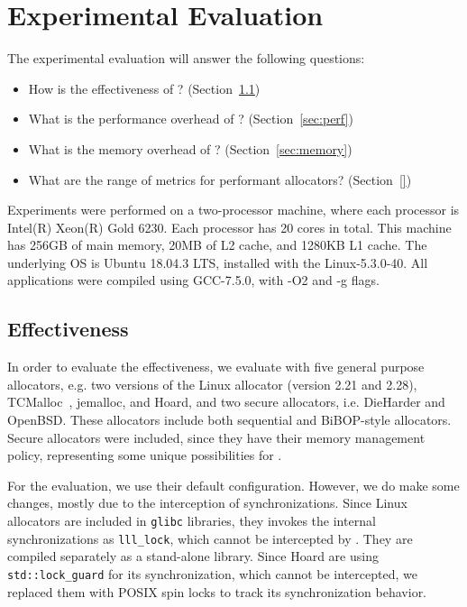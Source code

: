 \section{Experimental Evaluation}
\label{sec:evaluation}

The experimental evaluation will answer the following questions:
\begin{itemize}
\item How is the effectiveness of \MP{}? (Section~\ref{sec:effectiveness}) 	
\item What is the performance overhead of \MP{}? (Section~\ref{sec:perf})
\item What is the memory overhead of \MP{}? (Section~\ref{sec:memory})
\item What are the range of metrics for performant allocators? (Section~\ref{})
\end{itemize}

Experiments were performed on a two-processor machine, where each processor is Intel(R) Xeon(R) Gold 6230. Each processor has 20 cores in total. This machine has 256GB of main memory, 20MB of L2 cache, and 1280KB L1 cache. The underlying OS is Ubuntu 18.04.3 LTS, installed with the Linux-5.3.0-40. All applications were compiled using GCC-7.5.0, with -O2 and -g flags.

\subsection{Effectiveness}
\label{sec:effectiveness}

In order to evaluate the effectiveness, we evaluate \MP{} with five general purpose allocators, e.g. two versions of the Linux allocator (version 2.21 and 2.28), TCMalloc~\citep{tcmalloc}, jemalloc, and Hoard, and two secure allocators, i.e. DieHarder and OpenBSD. These allocators include both sequential and BiBOP-style allocators. Secure allocators were included, since they have their memory management policy, representing some unique possibilities for \MP{}. 

For the evaluation, we use their default configuration. However, we do make some changes, mostly due to the interception of synchronizations. Since Linux allocators are included in \texttt{glibc} libraries, they invokes the internal synchronizations as \texttt{lll\_lock}, which cannot be intercepted by \MP{}. They are compiled separately as a stand-alone library. Since Hoard are using \texttt{std::lock\_guard} for its synchronization, which cannot be intercepted, we replaced them with POSIX spin locks to track its synchronization behavior.

